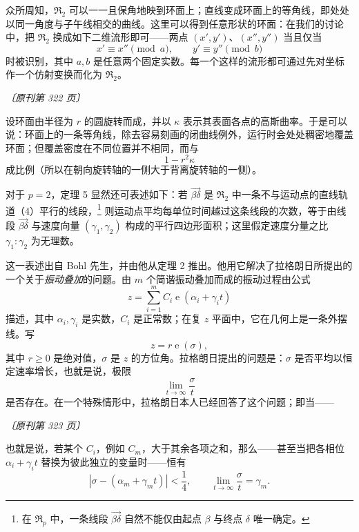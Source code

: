 \documentclass[UTF8,11pt,a4paper,fontset=none]{ctexart}
\theoremstyle{weylthm}
\newcommand{\e}{\operatorname{e}}
\newcommand{\origpage}[1]{%
  \par\vspace{0.7em}\noindent\hfill{\small\itshape〔原刊第 #1 页〕}\par\vspace{0.25em}}
\begin{document}
众所周知，\(\mathfrak R_2\) 可以一一且保角地映到环面上；直线变成环面上的等角线，即处处以同一角度与子午线相交的曲线。这里可以得到任意形状的环面：在我们的讨论中，把 \(\mathfrak R_2\) 换成如下二维流形即可——两点 \((x',y')\)、\((x'',y'')\) 当且仅当
\[
  x'\equiv x''\pmod a,
  \qquad
  y'\equiv y''\pmod b
\]
时被识别，其中 \(a,b\) 是任意两个固定实数。每一个这样的流形都可通过先对坐标作一个仿射变换而化为 \(\mathfrak R_2\)。

\origpage{322}

设环面由半径为 \(r\) 的圆旋转而成，并以 \(\kappa\) 表示其表面各点的高斯曲率。于是可以说：环面上的一条等角线，除去容易刻画的闭曲线例外，运行时会处处稠密地覆盖环面；但覆盖密度在不同位置并不相同，而与
\[
  1-r^2\kappa
\]
成比例（所以在朝向旋转轴的一侧大于背离旋转轴的一侧）。

对于 \(p=2\)，定理 5 显然还可表述如下：若 \(\overrightarrow{\beta\delta}\) 是 \(\mathfrak R_2\) 中一条不与运动点的直线轨道（4）平行的线段，\footnote{在 \(\mathfrak R_p\) 中，一条线段 \(\overrightarrow{\beta\delta}\) 自然不能仅由起点 \(\beta\) 与终点 \(\delta\) 唯一确定。} 则运动点平均每单位时间越过这条线段的次数，等于由线段 \(\overrightarrow{\beta\delta}\) 与速度向量 \((\gamma_1,\gamma_2)\) 构成的平行四边形面积；这里假定速度分量之比 \(\gamma_1:\gamma_2\) 为无理数。

这一表述出自 Bohl 先生，并由他从定理 2 推出。他用它解决了拉格朗日所提出的一个关于\emph{振动叠加}的问题。由 \(m\) 个简谐振动叠加而成的振动过程由公式
\begin{equation}
  z=\sum_{i=1}^{m}C_i\e(\alpha_i+\gamma_i t)
  \tag{5}
\end{equation}
描述，其中 \(\alpha_i,\gamma_i\) 是实数，\(C_i\) 是正常数；在复 \(z\) 平面中，它在几何上是一条外摆线。写
\[
  z=r\e(\sigma),
\]
其中 \(r\geq0\) 是绝对值，\(\sigma\) 是 \(z\) 的方位角。拉格朗日提出的问题是：\(\sigma\) 是否平均以恒定速率增长，也就是说，极限
\[
  \lim_{t\to\infty}\frac{\sigma}{t}
\]
是否存在。在一个特殊情形中，拉格朗日本人已经回答了这个问题；即当——

\origpage{323}

也就是说，若某个 \(C_i\)，例如 \(C_m\)，大于其余各项之和，那么——甚至当把各相位
\(\alpha_i+\gamma_i t\) 替换为彼此独立的变量时——恒有
\[
  \left|\sigma-(\alpha_m+\gamma_m t)\right|<\frac14,
  \qquad
  \lim_{t\to\infty}\frac{\sigma}{t}=\gamma_m.
\]
\end{document}

